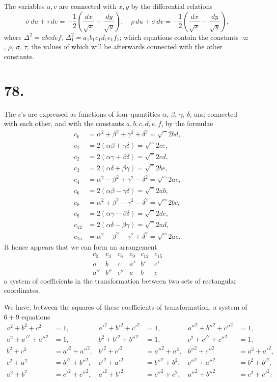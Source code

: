 \documentclass[11pt,a4paper]{article}
\begin{document}
The variables $u,v$ are connected with $x,y$ by the differential relations
\[
\sigma\,du + \tau\,dv = -\frac{1}{2}\left(\frac{dx}{\surd x} + \frac{dy}{\surd y}\right),\quad
\rho\,du + \sigma\,dv = -\frac{1}{2}\left(\frac{dx}{\surd x} - \frac{dy}{\surd y}\right),
\]
where $\Delta^2 = abcdef$, $\Delta_1^2 = a_1b_1c_1d_1e_1f_1$; which equations contain the constants $\varpi$, $\rho$, $\sigma$, $\tau$, the values of which will be afterwards connected with the other constants.

\section*{78.}
\label{sec:78}

The $c$'s are expressed as functions of four quantities $\alpha$, $\beta$, $\gamma$, $\delta$, and connected with each other, and with the constants $a,b,c,d,e,f$, by the formulae
\begin{align*}
c_0 &= \alpha^2 + \beta^2 + \gamma^2 + \delta^2 = \surd^2 bd, \\
c_1 &= 2(\alpha\beta + \gamma\delta) = \surd^2 ce, \\
c_2 &= 2(\alpha\gamma + \beta\delta) = \surd^2 cd, \\
c_3 &= 2(\alpha\delta + \beta\gamma) = \surd^2 be, \\
c_4 &= \alpha^2 - \beta^2 + \gamma^2 - \delta^2 = \surd^2 ac, \\
c_6 &= 2(\alpha\beta - \gamma\delta) = \surd^2 ab, \\
c_8 &= \alpha^2 + \beta^2 - \gamma^2 - \delta^2 = \surd^2 bc, \\
c_9 &= 2(\alpha\gamma - \beta\delta) = \surd^2 de, \\
c_{12} &= 2(\alpha\delta - \beta\gamma) = \surd^2 ad, \\
c_{15} &= \alpha^2 - \beta^2 - \gamma^2 + \delta^2 = \surd^2 ae.
\end{align*}
It hence appears that we can form an arrangement
\[
\begin{array}{ccc|ccc}
c_0 & c_3 & c_6 & c_9 & c_{12} & c_{15} \\
\hline
a & b & c & a' & b' & c' \\
a'' & b'' & c'' & a & b & c
\end{array}
\]
a system of coefficients in the transformation between two sets of rectangular coordinates.

We have, between the squares of these coefficients of transformation, a system of $6+9$ equations
\begin{align*}
a^2 + b^2 + c^2 &= 1, & a'^2 + b'^2 + c'^2 &= 1, & a''^2 + b''^2 + c''^2 &= 1, \\
a^2 + a'^2 + a''^2 &= 1, & b^2 + b'^2 + b''^2 &= 1, & c^2 + c'^2 + c''^2 &= 1, \\
b^2 + c^2 &= a'^2 + a''^2, & b'^2 + c'^2 &= a''^2 + a^2, & b''^2 + c''^2 &= a^2 + a'^2, \\
c^2 + a^2 &= b'^2 + b''^2, & c'^2 + a'^2 &= b''^2 + b^2, & c''^2 + a''^2 &= b^2 + b'^2, \\
a^2 + b^2 &= c'^2 + c''^2, & a'^2 + b'^2 &= c''^2 + c^2, & a''^2 + b''^2 &= c^2 + c'^2.
\end{align*}
\end{document}

